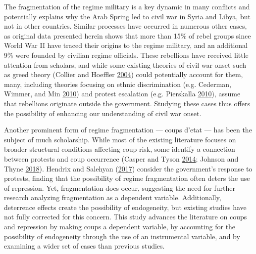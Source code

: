 \documentclass[12pt,]{article}
\theoremstyle{definition}
\theoremstyle{definition}
\theoremstyle{definition}
\theoremstyle{remark}
\begin{document}
The fragmentation of the regime military is a key dynamic in many
conflicts and potentially explains why the Arab Spring led to civil war
in Syria and Libya, but not in other countries. Similar processes have
occurred in numerous other cases, as original data presented herein
shows that more than 15\% of rebel groups since World War II have traced
their origins to the regime military, and an additional 9\% were founded
by civilian regime officials. These rebellions have received little
attention from scholars, and while some existing theories of civil war
onset such as greed theory (Collier and Hoeffler
\protect\hyperlink{ref-Collier2004}{2004}) could potentially account for
them, many, including theories focusing on ethnic discrimination (e.g.
Cederman, Wimmer, and Min \protect\hyperlink{ref-Cederman2010}{2010})
and protest escalation (e.g. Pierskalla
\protect\hyperlink{ref-Pierskalla2010}{2010}), assume that rebellions
originate outside the government. Studying these cases thus offers the
possibility of enhancing our understanding of civil war onset.

Another prominent form of regime fragmentation --- coups d'etat --- has
been the subject of much scholarship. While most of the existing
literature focuses on broader structural conditions affecting coup risk,
some identify a connection between protests and coup occurrence (Casper
and Tyson \protect\hyperlink{ref-Casper2014}{2014}; Johnson and Thyne
\protect\hyperlink{ref-Johnson2018}{2018}). Hendrix and Salehyan
(\protect\hyperlink{ref-Hendrix2017}{2017}) consider the government's
response to protests, finding that the possibility of regime
fragmentation often deters the use of repression. Yet, fragmentation
does occur, suggesting the need for further research analyzing
fragmentation as a dependent variable. Additionally, deterrence effects
create the possibility of endogeneity, but existing studies have not
fully corrected for this concern. This study advances the literature on
coups and repression by making coups a dependent variable, by accounting
for the possibility of endogeneity through the use of an instrumental
variable, and by examining a wider set of cases than previous studies.
\end{document}
